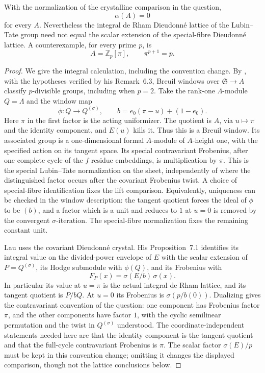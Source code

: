 \begin{proposition}\label{prop:DE-LT}
With the normalization of the crystalline comparison in the question,
\[
                         \alpha(A)=0
\]
for every $A$.  Nevertheless the integral de Rham Dieudonn\'e lattice of the Lubin--Tate group need not equal the scalar extension of the special-fibre Dieudonn\'e lattice.  A counterexample, for every prime $p$, is
\[
                   A=\mathbb Z_p[\pi],\qquad \pi^{p+1}=p.
\]
\end{proposition}
\begin{proof}
We give the integral calculation, including the convention change.  By \cite[Corollary~6.7]{Lau2014}, with the hypotheses verified by his Remark~6.3, Breuil windows over $\mathfrak S\to A$ classify $p$-divisible groups, including when $p=2$.  Take the rank-one $\Lambda$-module $Q=\Lambda$ and the window map
\[
 \phi:Q\longrightarrow Q^{(\sigma)},\qquad
 b=e_0(\pi-u)+(1-e_0).
\]
Here $\pi$ in the first factor is the acting uniformizer.  The quotient is $A$, via $u\mapsto\pi$ and the identity component, and $E(u)$ kills it.  Thus this is a Breuil window.  Its associated group is a one-dimensional formal $A$-module of $A$-height one, with the specified action on its tangent space.  Its special contravariant Frobenius, after one complete cycle of the $f$ residue embeddings, is multiplication by $\pi$.  This is the special Lubin--Tate normalization on the sheet, independently of where the distinguished factor occurs after the covariant Frobenius twist.  A choice of special-fibre identification fixes the lift comparison.  Equivalently, uniqueness can be checked in the window description: the tangent quotient forces the ideal of $\phi$ to be $(b)$, and a factor which is a unit and reduces to $1$ at $u=0$ is removed by the convergent $\sigma$-iteration.  The special-fibre normalization fixes the remaining constant unit.

Lau uses the covariant Dieudonn\'e crystal.  His Proposition~7.1 identifies its integral value on the divided-power envelope of $E$ with the scalar extension of $P=Q^{(\sigma)}$, its Hodge submodule with $\phi(Q)$, and its Frobenius with
\[
                     F_P(x)=\sigma(E/b)\,\sigma(x).
\]
In particular its value at $u=\pi$ is the actual integral de Rham lattice, and its tangent quotient is $P/bQ$.  At $u=0$ its Frobenius is $\sigma(p/b(0))$.  Dualizing gives the contravariant convention of the question: one component has Frobenius factor $\pi$, and the other components have factor $1$, with the cyclic semilinear permutation and the twist in $Q^{(\sigma)}$ understood.  The coordinate-independent statements needed here are that the identity component is the tangent quotient and that the full-cycle contravariant Frobenius is $\pi$.  The scalar factor $\sigma(E)/p$ must be kept in this convention change; omitting it changes the displayed comparison, though not the lattice conclusions below.


\end{proof}

